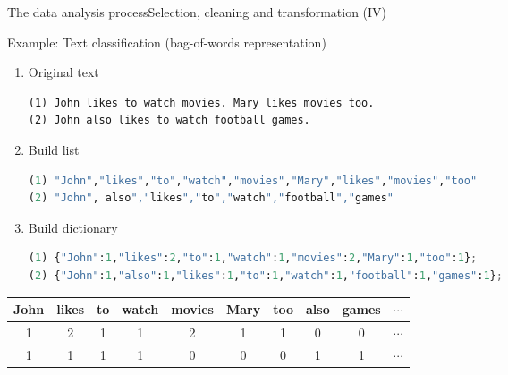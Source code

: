 \documentclass[10pt,compress]{beamer} %
\begin{document}
\begin{frame}[fragile]{The data analysis process}{Selection, cleaning and transformation (IV)}
	\begin{exampleblock}{Example: Text classification (bag-of-words representation)}
	 \vspace{-0.2cm}
	\begin{enumerate}
		\item Original text\\
		\begin{lstlisting}[basicstyle=\scriptsize]
(1) John likes to watch movies. Mary likes movies too.
(2) John also likes to watch football games.
\end{lstlisting}
		\item Build list\\
		\begin{lstlisting}[language=Python,basicstyle=\tiny]
(1) "John","likes","to","watch","movies","Mary","likes","movies","too"
(2) "John", also","likes","to","watch","football","games"
\end{lstlisting}
		\item Build dictionary\\
		\begin{lstlisting}[language=Python,basicstyle=\tiny]
(1) {"John":1,"likes":2,"to":1,"watch":1,"movies":2,"Mary":1,"too":1};
(2) {"John":1,"also":1,"likes":1,"to":1,"watch":1,"football":1,"games":1};
\end{lstlisting}
	\end{enumerate}

	 \vspace{-0.5cm}

	\begin{center}
	\begin{tabular}{cccccccccc}\hline
		 John & likes & to & watch & movies & Mary & too & also & games & $\cdots$ \\\hline
		 1    & 2     & 1  & 1     & 2      & 1    & 1   & 0 	& 0 	& $\cdots$ \\
		 1    & 1     & 1  & 1     & 0      & 0    & 0   & 1 	& 1 	& $\cdots$ \\
		 \hline
	 \end{tabular}
	 \end{center}
	 \vspace{-0.4cm}
	 \end{exampleblock}
\end{frame}
\end{document}
